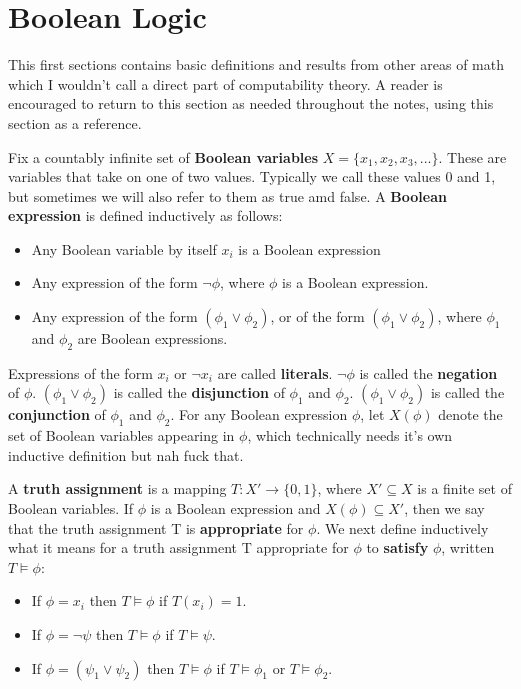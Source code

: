 \section{Boolean Logic}
This first sections contains basic definitions and results from other areas of math which I wouldn't call a direct part of computability theory. A reader is encouraged to return to this section as needed throughout the notes, using this section as a reference.
\begin{definition}
Fix a countably infinite set of \textbf{Boolean variables} $X = \{x_1,x_2,x_3,...\}$. These are variables that take on one of two values. Typically we call these values 0 and 1, but sometimes we will also refer to them as true amd false. A \textbf{Boolean expression} is defined inductively as follows:
\begin{itemize}
\item Any Boolean variable by itself $x_i$ is a Boolean expression
\item Any expression of the form $\neg \phi$, where $\phi$ is a Boolean expression.
\item Any expression of the form $(\phi_1 \vee \phi_2)$, or of the form $(\phi_1 \vee \phi_2)$, where $\phi_1$ and $\phi_2$ are Boolean expressions.
\end{itemize}
Expressions of the form $x_i$ or $\neg x_i$ are called \textbf{literals}. $\neg \phi$ is called the \textbf{negation} of $\phi$. $(\phi_1 \vee \phi_2)$ is called the \textbf{disjunction} of $\phi_1$ and $\phi_2$. $(\phi_1 \vee \phi_2)$ is called the \textbf{conjunction} of $\phi_1$ and $\phi_2$. For any Boolean expression $\phi$, let $X(\phi)$ denote the set of Boolean variables appearing in $\phi$, which technically needs it's own inductive definition but nah fuck that.
\par A \textbf{truth assignment} is a mapping $T:X' \to \{0,1\}$, where $X' \subseteq X$ is a finite set of Boolean variables. If $\phi$ is a Boolean expression and $X(\phi) \subseteq X'$, then we say that the truth assignment T is \textbf{appropriate} for $\phi$. We next define inductively what it means for a truth assignment T appropriate for $\phi$ to \textbf{satisfy} $\phi$, written $T \models \phi$:
\begin{itemize}
    \item If $\phi=x_i$ then $T \models \phi$ if $T(x_i)=1$.
    \item If $\phi=\neg \psi$ then $T \models \phi$ if $T \models \psi$.
    \item If $\phi = (\psi_1 \vee \psi_2)$ then $T \models \phi$ if $T \models \phi_1$ or $T \models \phi_2$. 

\end{itemize}
\end{definition}
